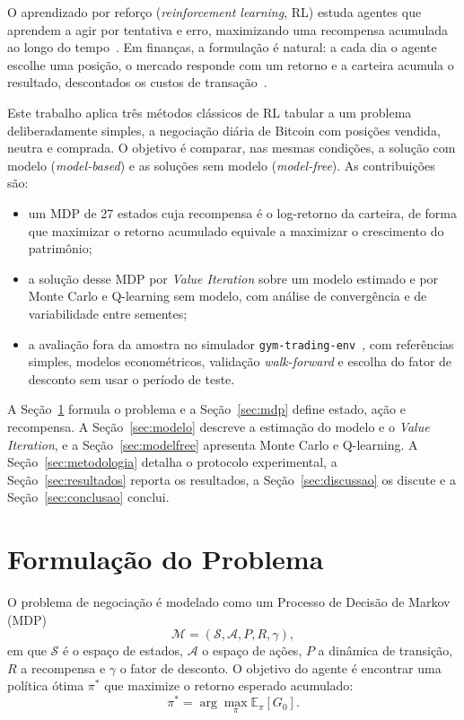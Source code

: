 \documentclass[conference]{IEEEtran}
\begin{document}
O aprendizado por reforço (\textit{reinforcement learning}, RL) estuda agentes que aprendem a agir por tentativa e erro, maximizando uma recompensa acumulada ao longo do tempo~\cite{sutton2018}. Em finanças, a formulação é natural: a cada dia o agente escolhe uma posição, o mercado responde com um retorno e a carteira acumula o resultado, descontados os custos de transação~\cite{moody1998,moody2001}.

Este trabalho aplica três métodos clássicos de RL tabular a um problema deliberadamente simples, a negociação diária de Bitcoin com posições vendida, neutra e comprada. O objetivo é comparar, nas mesmas condições, a solução com modelo (\textit{model-based}) e as soluções sem modelo (\textit{model-free}). As contribuições são:
\begin{itemize}
  \item um MDP de 27 estados cuja recompensa é o log-retorno da carteira, de forma que maximizar o retorno acumulado equivale a maximizar o crescimento do patrimônio;
  \item a solução desse MDP por \textit{Value Iteration} sobre um modelo estimado e por Monte Carlo e Q-learning sem modelo, com análise de convergência e de variabilidade entre sementes;
  \item a avaliação fora da amostra no simulador \texttt{gym-trading-env}~\cite{gymtrading}, com referências simples, modelos econométricos, validação \textit{walk-forward} e escolha do fator de desconto sem usar o período de teste.
\end{itemize}

A Seção~\ref{sec:formulacao} formula o problema e a Seção~\ref{sec:mdp} define estado, ação e recompensa. A Seção~\ref{sec:modelo} descreve a estimação do modelo e o \textit{Value Iteration}, e a Seção~\ref{sec:modelfree} apresenta Monte Carlo e Q-learning. A Seção~\ref{sec:metodologia} detalha o protocolo experimental, a Seção~\ref{sec:resultados} reporta os resultados, a Seção~\ref{sec:discussao} os discute e a Seção~\ref{sec:conclusao} conclui.

\section{Formulação do Problema}
\label{sec:formulacao}

O problema de negociação é modelado como um Processo de Decisão de Markov (MDP)~\cite{puterman1994,sutton2018}
\begin{equation}
  \mathcal{M} = (\mathcal{S}, \mathcal{A}, P, R, \gamma),
\end{equation}
em que $\mathcal{S}$ é o espaço de estados, $\mathcal{A}$ o espaço de ações, $P$ a dinâmica de transição, $R$ a recompensa e $\gamma$ o fator de desconto. O objetivo do agente é encontrar uma política ótima $\pi^*$ que maximize o retorno esperado acumulado:
\begin{equation}
  \pi^* = \arg\max_{\pi} \mathbb{E}_{\pi}[G_0].
\end{equation}
\end{document}
